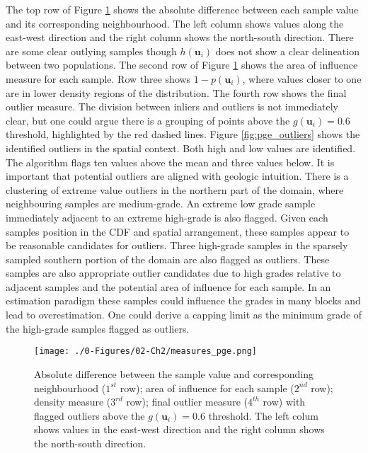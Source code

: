 The top row of Figure \ref{fig:measures_pge} shows the absolute difference between each sample value and its corresponding neighbourhood. The left column shows values along the east-west direction and the right column shows the north-south direction. There are some clear outlying samples though $h(\mathbf{u}_{i})$ does not show a clear delineation between two populations. The second row of Figure \ref{fig:measures_pge} shows the area of influence measure for each sample. Row three shows $1-p(\mathbf{u}_{i})$, where values closer to one are in lower density regions of the distribution. The fourth row shows the final outlier measure. The division between inliers and outliers is not immediately clear, but one could argue there is a grouping of points above the $g(\mathbf{u}_{i})=0.6$ threshold, highlighted by the red dashed lines. Figure \ref{fig:pge_outliers} shows the identified outliers in the spatial context. Both high and low values are identified. The algorithm flags ten values above the mean and three values below. It is important that potential outliers are aligned with geologic intuition. There is a clustering of extreme value outliers in the northern part of the domain, where neighbouring samples are medium-grade. An extreme low grade sample immediately adjacent to an extreme high-grade is also flagged. Given each samples position in the \gls{CDF} and spatial arrangement, these samples appear to be reasonable candidates for outliers. Three high-grade samples in the sparsely sampled southern portion of the domain are also flagged as outliers. These samples are also appropriate outlier candidates due to high grades relative to adjacent samples and the potential area of influence for each sample. In an estimation paradigm these samples could influence the grades in many blocks and lead to overestimation. One could derive a capping limit as the minimum grade of the high-grade samples flagged as outliers.

\begin{figure}[t!]
    \centering
    \texttt{[image: ./0-Figures/02-Ch2/measures\_pge.png]}
    \caption{Absolute difference between the sample value and corresponding neighbourhood ($1^{st}$ row); area of influence for each sample ($2^{nd}$ row); density measure ($3^{rd}$ row); final outlier measure ($4^{th}$ row) with flagged outliers above the $g(\mathbf{u}_{i})=0.6$ threshold. The left colum shows values in the east-west direction and the right column shows the north-south direction. }
    \label{fig:measures_pge}
\end{figure}

